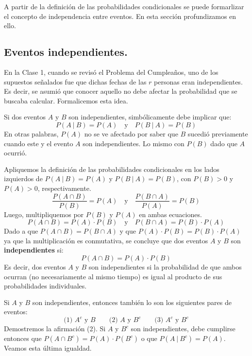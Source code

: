 \documentclass[12pt]{article}
\begin{document}
A partir de la definición de las probabilidades condicionales se puede formarlizar el concepto de independencia entre eventos. En esta sección profundizamos en ello.

\subsection{Eventos independientes.}

En la Clase 1, cuando se revisó el Problema del Cumpleaños, uno de los supuestos señalados fue que dichas fechas de las $r$ personas eran independientes. Es decir, se asumió que conocer aquello no debe afectar la probabilidad que se buscaba calcular. Formalicemos esta idea.

Si dos eventos $A$ y $B$ son independientes, simbólicamente debe implicar que:
\[
  P(A \ | \ B) = P(A) \quad \text{y} \quad P(B \ | \ A) = P(B)
\]
En otras palabras, $P(A)$ no se ve afectado por saber que $B$ sucedió previamente cuando este y el evento $A$ son independientes. Lo mismo con $P(B)$ dado que $A$ ocurrió.

Apliquemos la definición de las probabilidades condicionales en los lados izquierdos de $P(A \ | \ B) = P(A)$ y $P(B \ | \ A) = P(B)$, con $P(B) > 0$ y $P(A) > 0$, respectivamente.
\[
  \frac{P(A \cap B)}{P(B)} = P(A) \quad \text{y} \quad \frac{P(B \cap A)}{P(A)} = P(B)
\]
Luego, multipliquemos por $P(B)$ y $P(A)$ en ambas ecuaciones.
\[
  P(A \cap B) = P(A) \cdot P(B) \quad \text{y} \quad P(B \cap A) = P(B) \cdot P(A)
\]
Dado a que $P(A \cap B) = P(B \cap A)$ y que $P(A) \cdot P(B) = P(B) \cdot P(A)$ ya que la multiplicación es conmutativa, se concluye que dos eventos $A$ y $B$ son \textbf{independientes} si:
\[
  P(A \cap B) = P(A) \cdot P(B)
\]
Es decir, dos eventos $A$ y $B$ son independientes si la probabilidad de que ambos ocurran (no necesariamente al mismo tiempo) es igual al producto de sus probabilidades individuales.

Si $A$ y $B$ son independientes, entonces también lo son los siguientes pares de eventos:
\[
  \text{(1) } A^{c} \text{ y } B \qquad \text{(2) } A \text{ y } B^{c} \qquad \text{(3) } A^{c} \text{ y } B^{c}
\]
Demostremos la afirmación (2). Si $A$ y $B^{c}$ son independientes, debe cumplirse entonces que $P(A \cap B^{c}) = P(A) \cdot P(B^{c})$ o que $P(A \ | \ B^{c}) = P(A)$. Veamos esta última igualdad.
\end{document}
